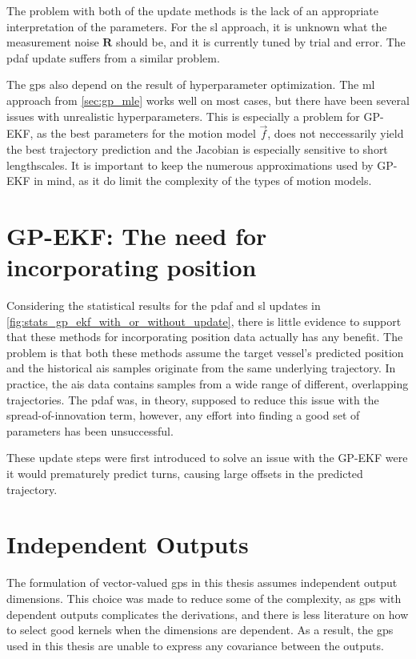 The problem with both of the update methods is the lack of an appropriate interpretation of the parameters. For the \acrshort{sl} approach, it is unknown what the measurement noise $\boldsymbol{R}$ should be, and it is currently tuned by trial and error. The \acrshort{pdaf} update suffers from a similar problem.

The \acrshort{gp}s also depend on the result of hyperparameter optimization. The \acrshort{ml} approach from \cref{sec:gp_mle} works well on most cases, but there have been several issues with unrealistic hyperparameters. This is especially a problem for GP-EKF, as the best parameters for the motion model $\vec{f}$, does not neccessarily yield the best trajectory prediction and the Jacobian is especially sensitive to short lengthscales. It is important to keep the numerous approximations used by GP-EKF in mind, as it do limit the complexity of the types of motion models.

\section{GP-EKF: The need for incorporating position}
Considering the statistical results for the \acrshort{pdaf} and \acrshort{sl} updates in \cref{fig:stats_gp_ekf_with_or_without_update}, there is little evidence to support that these methods for incorporating position data actually has any benefit. The problem is that both these methods assume the target vessel's predicted position and the historical \acrshort{ais} samples originate from the same underlying trajectory. In practice, the \acrshort{ais} data contains samples from a wide range of different, overlapping trajectories. The \acrshort{pdaf} was, in theory, supposed to reduce this issue with the spread-of-innovation term, however, any effort into finding a good set of parameters has been unsuccessful.  

These update steps were first introduced to solve an issue with the GP-EKF were it would prematurely predict turns, causing large offsets in the predicted trajectory. 


\section{Independent Outputs}

The formulation of vector-valued \acrshort{gp}s in this thesis assumes independent output dimensions. This choice was made to reduce some of the complexity, as \acrshort{gp}s with dependent outputs complicates the derivations, and there is less literature on how to select good kernels when the dimensions are dependent. As a result, the \acrshort{gp}s used in this thesis are unable to express any covariance between the outputs. 

